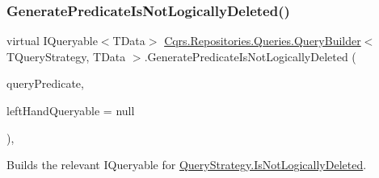 \subsubsection{\texorpdfstring{Generate\+Predicate\+Is\+Not\+Logically\+Deleted()}{GeneratePredicateIsNotLogicallyDeleted()}}
{\footnotesize\ttfamily virtual I\+Queryable$<$T\+Data$>$ \hyperlink{classCqrs_1_1Repositories_1_1Queries_1_1QueryBuilder}{Cqrs.\+Repositories.\+Queries.\+Query\+Builder}$<$ T\+Query\+Strategy, T\+Data $>$.Generate\+Predicate\+Is\+Not\+Logically\+Deleted (\begin{DoxyParamCaption}\item[{\hyperlink{classCqrs_1_1Repositories_1_1Queries_1_1QueryPredicate}{Query\+Predicate}}]{query\+Predicate,  }\item[{I\+Queryable$<$ T\+Data $>$}]{left\+Hand\+Queryable = {\ttfamily null} }\end{DoxyParamCaption})\hspace{0.3cm}{\ttfamily [protected]}, {\ttfamily [virtual]}}



Builds the relevant I\+Queryable for \hyperlink{classCqrs_1_1Repositories_1_1Queries_1_1QueryStrategy_ab1841119fbbb58337d55b014a8b260b4_ab1841119fbbb58337d55b014a8b260b4}{Query\+Strategy.\+Is\+Not\+Logically\+Deleted}. 

\mbox{\label{classCqrs_1_1Repositories_1_1Queries_1_1QueryBuilder_a7768a63fd46f991f87a00b51484c2f34_a7768a63fd46f991f87a00b51484c2f34}} 
